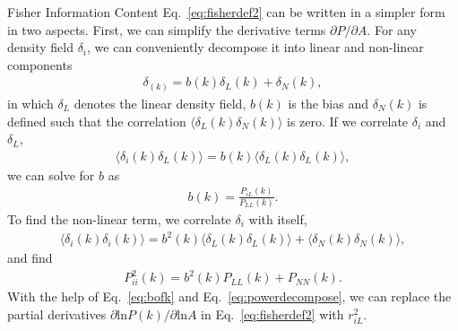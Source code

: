 \begin{section}{Fisher Information Content}
  Eq.~\ref{eq:fisherdef2} can be written in a simpler
  form in two aspects.   First, we can simplify the derivative terms
  $\partial P/\partial A$.  For any density field $\delta_i$, we can
  conveniently decompose it into linear and non-linear components
  \begin{align}
    \delta_(k) = b (k) \delta _L (k) + \delta_{N}(k),
    \label{eq:decompose}
  \end{align}
  in which $\delta_L$ denotes the linear density field, $b(k)$ is the
  bias and $\delta_{N}(k)$ is defined such that the correlation
  $\langle \delta_L(k)\delta_{N}(k) \rangle$ is zero.  If we correlate
  $\delta_i$ and $\delta_L$,
  \begin{align}
    \langle \delta_i(k)\delta_L(k) \rangle = b(k) \langle \delta_L(k)\delta_L(k) \rangle,
    \label{eq:correlating}
  \end{align} 
  we can solve for $b$ as
  \begin{align}
    b (k) = \frac{P _{iL}(k)}{P_{LL}(k)}.
    \label{eq:bofk}
  \end{align}
  To find the non-linear term, we correlate $\delta_i$ with itself,
  \begin{align}
    \langle \delta_i(k) \delta_i(k) \rangle = 
    b^2(k) \langle \delta_L(k) \delta_L(k) \rangle + \langle \delta_{N}(k)\delta_{N}(k) \rangle,
  \end{align}
  and find
  \begin{align}
    P_{ii}^2 (k) = b^2(k) P_{LL} (k) + P_{NN} (k).
    \label{eq:powerdecompose}
  \end{align}
  With the help of Eq.~\ref{eq:bofk} and Eq.~\ref{eq:powerdecompose},
  we can replace the partial derivatives
  $\partial \mathrm{ln} P(k) / \partial \mathrm{ln} A$ in
  Eq.~\ref{eq:fisherdef2} with $r^2_{iL}$.


\end{section}
